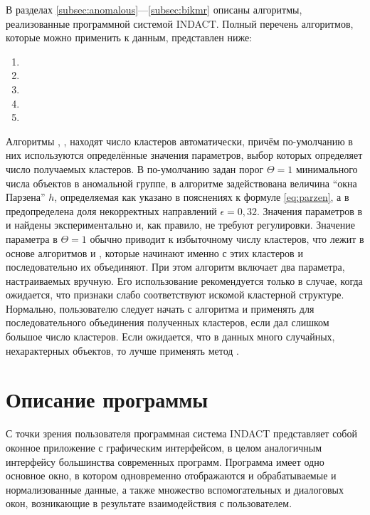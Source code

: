 \documentclass[12pt]{diploma}
\begin{document}
	В разделах \ref{subsec:anomalous}---\ref{subsec:bikmr} описаны алгоритмы, реализованные программной системой INDACT. Полный  перечень алгоритмов, которые можно применить к данным, представлен ниже:
	
	\begin{enumerate}
		\item \ikmeans
		\item \AWard
		\item \AWardpb
		\item \dePDDP
		\item \BiKMR
	\end{enumerate}
	
	
	Алгоритмы \ikmeans, \dePDDP, \BiKMR находят число кластеров автоматически, причём по-умолчанию в них используются определённые значения параметров, выбор которых определяет число получаемых кластеров. В \ikmeans по-умолчанию задан порог $ \Theta=1 $ минимального числа объектов в аномальной группе, в алгоритме \dePDDP задействована величина ``окна Парзена'' $ h $, определяемая как указано в пояснениях к формуле \eqref{eq:parzen}, а в \BiKMR предопределена доля некорректных направлений $ \epsilon=0,32 $. Значения параметров в \dePDDP и \BiKMR найдены  экспериментально и, как правило, не требуют регулировки. Значение параметра в \ikmeans $ \Theta=1 $ обычно приводит к избыточному числу кластеров, что лежит в основе алгоритмов \AWard и \AWardpb, которые начинают именно с этих кластеров и последовательно их объединяют. При этом алгоритм \AWardpb включает два параметра, настраиваемых вручную. Его использование рекомендуется только в случае, когда ожидается, что признаки слабо соответствуют искомой кластерной структуре. Нормально, пользователю следует начать с алгоритма \ikmeans и применять \AWard для последовательного объединения полученных кластеров, если \ikmeans дал слишком большое число кластеров. Если ожидается, что в данных много случайных, нехарактерных объектов, то лучше применять метод \BiKMR.
	
	\section{Описание программы}
	
	С точки зрения пользователя программная система INDACT представляет собой оконное приложение с графическим интерфейсом, в целом аналогичным интерфейсу большинства современных программ. Программа имеет одно основное окно, в котором одновременно отображаются и обрабатываемые и нормализованные данные, а также множество вспомогательных и диалоговых окон, возникающие в результате взаимодействия с пользователем. 
	
\end{document}
